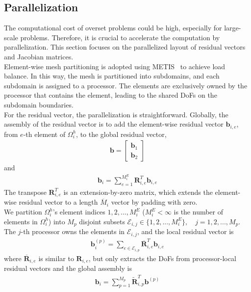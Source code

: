 \documentclass[preprint,12pt,sort&compress]{elsarticle}
\theoremstyle{definition}%
\begin{document}
\subsection{Parallelization}\label{sec:parallelization}
The computational cost of overset problems could be high, especially for large-scale problems.
Therefore, it is crucial to accelerate the computation by parallelization. This section focuses on the
parallelized layout of residual vectors and  Jacobian matrices.\\
Element-wise mesh partitioning is adopted using METIS~\cite{karypis1998fast} to achieve load balance. In
this way, the mesh is partitioned into subdomains, and each subdomain is assigned to a processor.
The elements are exclusively owned by the processor that contains the element, leading to the shared DoFs
on the subdomain boundaries.\\
For the residual vector, the parallelization is straightforward. Globally, the assembly of the residual 
vector is to add the element-wise residual vector $\bm{b}_{i,e}$, from $e$-th element of $\Omega_i^h$, 
to the global residual vector,
\begin{align}
  \bm{b} =
  \begin{bmatrix}
    \bm{b}_1\\
    \bm{b}_2
  \end{bmatrix}
\end{align}
and 
\begin{align}
  \bm{b}_i=\sum_{e=1}^{M^E_i}\bm{R}^T_{i,e}\bm{b}_{i,e}
\end{align}
The transpose $\bm{R}^T_{i,e}$ is an extension-by-zero matrix, which extends the element-wise residual vector
to a length $\overline{M}_i$ vector by padding with zero.\\
We partition $\Omega_i^h$'s element indices $1, 2, ..., M^E_i$ ($M^E_i<\infty$ is the number of elements in $\Omega_i^h$)
into $M_p$ disjoint subsets
$\mathcal{E}_{i,j} \in \{1, 2, ..., M^E_i\}, \quad j=1, 2, ..., M_p$.
The $j$-th processor owns the elements in $\mathcal{E}_{i,j}$, and the local residual vector is
\begin{align}
  \bm{b}^{(p)}_i = 
    \sum_{e\in\mathcal{E}_{i,p}}\overline{\bm{R}}^T_{i,e}\bm{b}_{i,e}
\end{align}
where $\overline{\bm{R}}_{i,e}$ is similar to $\bm{R}_{i,e}$, but only extracts the DoFs from 
processor-local residual vectors and the global assembly is 
\begin{align}
  \bm{b}_i = \sum_{p=1}^{M_p} {\tilde{\bm{R}}}^T_{i,p}\bm{b}^{(p)}\label{eq:vector-assembly}
\end{align}
\end{document}
